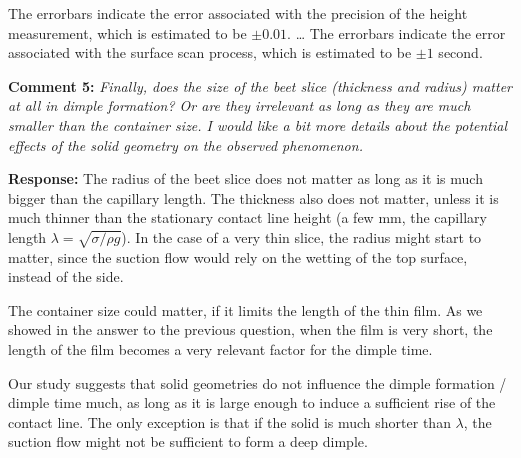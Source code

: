 \documentclass[11pt]{article}
\newif\ifhighlight
\newcommand{\hl}[1]{\ifhighlight\textcolor{blue}{#1}\else#1\fi}
\begin{document}
\hl{
The errorbars indicate the error associated with the precision of the height measurement, which is estimated to be $\pm 0.01$. … The errorbars indicate the error associated with the surface scan process, which is estimated to be $\pm 1$ second.
}

\bigskip
\begin{siderules}
\textbf{Comment 5:} \textit{Finally, does the size of the beet slice (thickness and radius) matter at all in dimple formation? Or are they irrelevant as long as they are much smaller than the container size. I would like a bit more details about the potential effects of the solid geometry on the observed phenomenon.}
\end{siderules}

\textbf{Response:} The radius of the beet slice does not matter as long as it is much bigger than the capillary length. The thickness also does not matter, unless it is much thinner than the stationary contact line height (a few mm, the capillary length $\lambda=\sqrt{\sigma/\rho g}$). 
In the case of a very thin slice, the radius might start to matter, since the suction flow would rely on the wetting of the top surface, instead of the side.

The container size could matter, if it limits the length of the thin film. 
As we showed in the answer to the previous question, when the film is very short, the length of the film becomes a very relevant factor for the dimple time. 

Our study suggests that solid geometries do not influence the dimple formation / dimple time much, as long as it is large enough to induce a sufficient rise of the contact line. 
The only exception is that if the solid is much shorter than $\lambda$, the suction flow might not be sufficient to form a deep dimple. 
\end{document}
